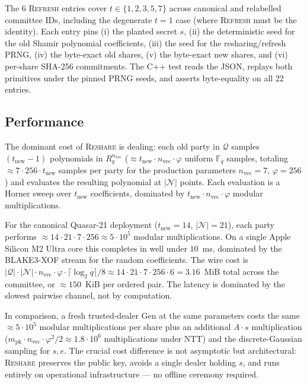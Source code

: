 The 6 \textsc{Refresh} entries cover $t \in \{1, 2, 3, 5, 7\}$ across canonical and relabelled committee IDs, including the degenerate $t = 1$ case (where \textsc{Refresh} must be the identity). Each entry pins (i) the planted secret $s$, (ii) the deterministic seed for the old Shamir polynomial coefficients, (iii) the seed for the resharing/refresh PRNG, (iv) the byte-exact old shares, (v) the byte-exact new shares, and (vi) per-share SHA-256 commitments. The C++ test reads the JSON, replays both primitives under the pinned PRNG seeds, and asserts byte-equality on all 22 entries.

\subsection{Performance}

The dominant cost of \textsc{Reshare} is dealing: each old party in $\mathcal{Q}$ samples $(t_{\mathrm{new}} - 1)$ polynomials in $R_q^{n_{\textrm{vec}}}$ ($\approx t_{\mathrm{new}} \cdot n_{\textrm{vec}} \cdot \varphi$ uniform $\mathbb{F}_q$ samples, totaling $\approx 7 \cdot 256 \cdot t_{\mathrm{new}}$ samples per party for the production parameters $n_{\textrm{vec}} = 7$, $\varphi = 256$) and evaluates the resulting polynomial at $|\mathcal{N}|$ points. Each evaluation is a Horner sweep over $t_{\mathrm{new}}$ coefficients, dominated by $t_{\mathrm{new}} \cdot n_{\textrm{vec}} \cdot \varphi$ modular multiplications.

For the canonical Quasar-21 deployment ($t_{\mathrm{new}} = 14$, $|\mathcal{N}| = 21$), each party performs $\approx 14 \cdot 21 \cdot 7 \cdot 256 \approx 5 \cdot 10^5$ modular multiplications. On a single Apple Silicon M2 Ultra core this completes in well under $10$~ms, dominated by the BLAKE3-XOF stream for the random coefficients. The wire cost is $|\mathcal{Q}| \cdot |\mathcal{N}| \cdot n_{\textrm{vec}} \cdot \varphi \cdot \lceil \log_2 q \rceil / 8 \approx 14 \cdot 21 \cdot 7 \cdot 256 \cdot 6 = 3.16$~MiB total across the committee, or $\approx 150$~KiB per ordered pair. The latency is dominated by the slowest pairwise channel, not by computation.

In comparison, a fresh trusted-dealer Gen at the same parameters costs the same $\approx 5 \cdot 10^5$ modular multiplications per share plus an additional $A \cdot s$ multiplication ($m_{\textrm{pk}} \cdot n_{\textrm{vec}} \cdot \varphi^2 / 2 \approx 1.8 \cdot 10^6$ multiplications under NTT) and the discrete-Gaussian sampling for $s, e$. The crucial cost difference is not asymptotic but architectural: \textsc{Reshare} preserves the public key, avoids a single dealer holding $s$, and runs entirely on operational infrastructure --- no offline ceremony required.
